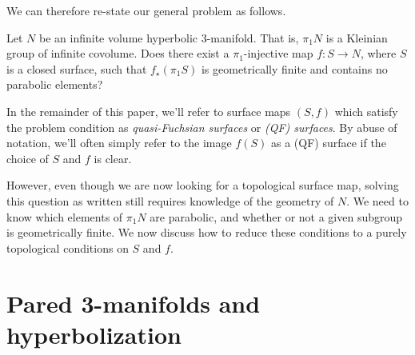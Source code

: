 We can therefore re-state our general problem as follows.

\begin{prob}

Let $N$ be an infinite volume hyperbolic 3-manifold. That is, $\pi_1N$ is
a Kleinian group of infinite covolume. Does there exist a $\pi_1$-injective map
$f \colon S \to N$, where $S$ is a closed surface, such that $f_\star(\pi_1S)$
is geometrically finite and contains no parabolic elements?

\end{prob}

In the remainder of this paper, we'll refer to surface maps $(S,f)$ which
satisfy the problem condition as \emph{quasi-Fuchsian surfaces} or \emph{(QF)
surfaces}. By abuse of notation, we'll often simply refer to the image $f(S)$
as a (QF) surface if the choice of $S$ and $f$ is clear.

However, even though we are now looking for a topological surface map, solving
this question as written still requires knowledge of the geometry of $N$. We
need to know which elements of $\pi_1N$ are parabolic, and whether or not
a given subgroup is geometrically finite. We now discuss how to reduce these
conditions to a purely topological conditions on $S$ and $f$.

\section{Pared 3-manifolds and hyperbolization}

